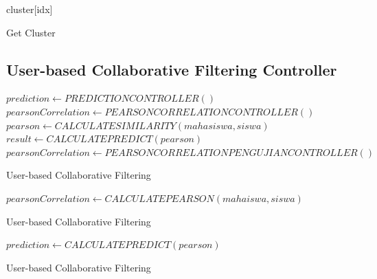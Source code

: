 \begin{algorithm}[H]
  \begin{algorithmic}[1]
        \State \Return cluster[idx]
    \EndProcedure
  \end{algorithmic} 
  \caption{Get Cluster}
  \label{alg:getCluster}
\end{algorithm}

\subsection{User-based Collaborative Filtering Controller}
\label{subsec:user-based}

\begin{algorithm}[H]
  \begin{algorithmic}[1]
        \State $prediction \gets PREDICTIONCONTROLLER()$
            \State $pearsonCorrelation \gets PEARSONCORRELATIONCONTROLLER()$
            \State $pearson \gets CALCULATESIMILARITY (mahasiswa, siswa)$
            \State $result \gets CALCULATEPREDICT(pearson)$
            \State $pearsonCorrelation \gets PEARSONCORRELATIONPENGUJIANCONTROLLER()$
        \EndIf
    \EndProcedure
  \end{algorithmic} 
  \caption{User-based Collaborative Filtering}
  \label{alg:contructor user-based}
\end{algorithm}

\begin{algorithm}[H]
  \begin{algorithmic}[1]
        \State \Return $pearsonCorrelation \gets CALCULATEPEARSON(mahaiswa, siswa)$
    \EndProcedure
  \end{algorithmic} 
  \caption{User-based Collaborative Filtering}
  \label{alg:calculateSimilarity user-based}
\end{algorithm}

\begin{algorithm}[H]
  \begin{algorithmic}[1]
        \State \Return $prediction \gets CALCULATEPREDICT(pearson)$
    \EndProcedure
  \end{algorithmic} 
  \caption{User-based Collaborative Filtering}
  \label{alg:calculatePredict user-based}
\end{algorithm}

